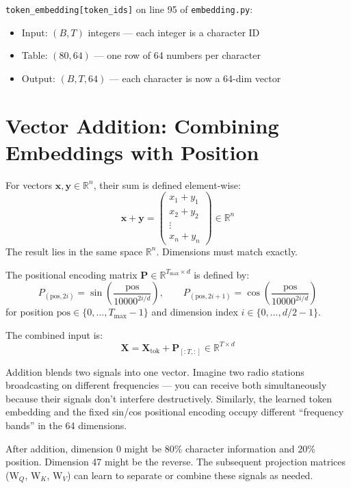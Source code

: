 \documentclass[11pt, a4paper]{article}
\newcommand{\R}{\mathbb{R}}
\newcommand{\vx}{\bm{x}}
\newcommand{\mX}{\bm{X}}
\newcommand{\mP}{\bm{P}}
\begin{document}
\begin{transformer}
\texttt{token\_embedding[token\_ids]} on line 95 of \texttt{embedding.py}:
\begin{itemize}[nosep]
  \item Input: $(B, T)$ integers --- each integer is a character ID
  \item Table: $(80, 64)$ --- one row of 64 numbers per character
  \item Output: $(B, T, 64)$ --- each character is now a 64-dim vector
\end{itemize}
\end{transformer}

\section{Vector Addition: Combining Embeddings with Position}

\begin{formaldef}
For vectors $\vx, \bm{y} \in \R^n$, their sum is defined element-wise:
\[
\vx + \bm{y} = \begin{pmatrix} x_1 + y_1 \\ x_2 + y_2 \\ \vdots \\ x_n + y_n \end{pmatrix} \in \R^n
\]
The result lies in the same space $\R^n$. Dimensions must match exactly.
\end{formaldef}

\begin{formaldef}
The positional encoding matrix $\mP \in \R^{T_{\max} \times d}$ is defined by:
\[
P_{(\text{pos}, 2i)} = \sin\!\left(\frac{\text{pos}}{10000^{2i/d}}\right), \qquad
P_{(\text{pos}, 2i+1)} = \cos\!\left(\frac{\text{pos}}{10000^{2i/d}}\right)
\]
for position $\text{pos} \in \{0, \ldots, T_{\max}-1\}$ and dimension index $i \in \{0, \ldots, d/2 - 1\}$.

The combined input is:
\[
\mX = \mX_{\text{tok}} + \mP_{[:T,:]} \in \R^{T \times d}
\]
\end{formaldef}

\begin{intuition}
Addition blends two signals into one vector. Imagine two radio stations broadcasting
on different frequencies --- you can receive both simultaneously because their signals
don't interfere destructively. Similarly, the learned token embedding and the fixed
sin/cos positional encoding occupy different ``frequency bands'' in the 64 dimensions.

After addition, dimension 0 might be 80\% character information and 20\% position.
Dimension 47 might be the reverse. The subsequent projection matrices (W$_Q$, W$_K$, W$_V$)
can learn to separate or combine these signals as needed.
\end{intuition}
\end{document}
